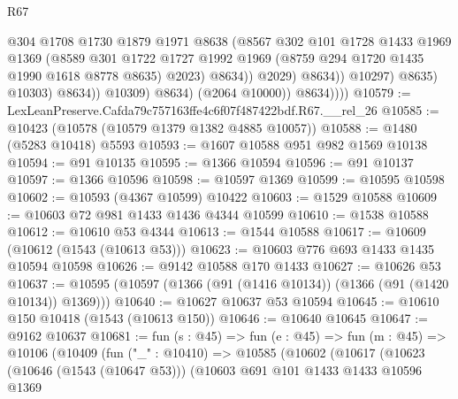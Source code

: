 \begin{lexlean}{R67}
\begin{coremodule}
                                    @304
                                    @1708
                                    @1730
                                    @1879
                                    @1971
                                    @8638
                                    (@8567
                                      @302
                                      @101
                                      @1728
                                      @1433
                                      @1969
                                      @1369
                                      (@8589
                                        @301
                                        @1722
                                        @1727
                                        @1992
                                        @1969
                                        (@8759 @294 @1720 @1435 @1990 @1618 @8778 @8635)
                                        @2023)
                                      @8634))
                                  @2029)
                                @8634))
                            @10297)
                          @8635)
                        @10303)
                      @8634))
                  @10309)
                @8634)
              (@2064 @10000))
            @8634))))
@10579 := LexLeanPreserve.Cafda79c757163ffe4c6f07f487422bdf.R67.__rel_26
@10585 := @10423 (@10578 (@10579 @1379 @1382 @4885 @10057))
@10588 := @1480 (@5283 @10418) @5593
@10593 := @1607 @10588 @951 @982 @1569 @10138
@10594 := @91 @10135
@10595 := @1366 @10594
@10596 := @91 @10137
@10597 := @1366 @10596
@10598 := @10597 @1369
@10599 := @10595 @10598
@10602 := @10593 (@4367 @10599) @10422
@10603 := @1529 @10588
@10609 := @10603 @72 @981 @1433 @1436 @4344 @10599
@10610 := @1538 @10588
@10612 := @10610 @53 @4344
@10613 := @1544 @10588
@10617 := @10609 (@10612 (@1543 (@10613 @53)))
@10623 := @10603 @776 @693 @1433 @1435 @10594 @10598
@10626 := @9142 @10588 @170 @1433
@10627 := @10626 @53
@10637 := @10595 (@10597 (@1366 (@91 (@1416 @10134)) (@1366 (@91 (@1420 @10134)) @1369)))
@10640 := @10627 @10637 @53 @10594
@10645 := @10610 @150 @10418 (@1543 (@10613 @150))
@10646 := @10640 @10645
@10647 := @9162 @10637
@10681 := fun (s : @45) =>
  fun (e : @45) =>
  fun (m : @45) =>
  @10106
    (@10409
      (fun ("_" : @10410) =>
      @10585
        (@10602
          (@10617
            (@10623
              (@10646 (@1543 (@10647 @53)))
              (@10603
                @691
                @101
                @1433
                @1433
                @10596
                @1369

\end{coremodule}
\end{lexlean}
